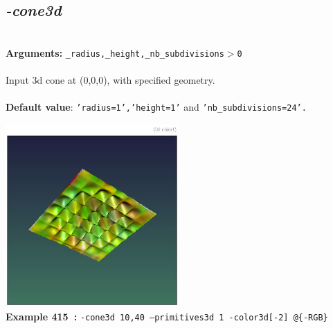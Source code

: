 \documentclass[a4paper,11pt,twoside]{book}
\begin{document}
\subsection{\emph{-cone3d} }\vspace*{-0.5em}
~\\\textbf{Arguments: } 
{\small \texttt{\_radius,\_height,\_nb\_subdivisions$>$0}}\\~\\
Input 3d cone at (0,0,0), with specified geometry.
~\\~\\\textbf{Default value}: {\small \texttt{'radius=1','height=1'} and \texttt{'nb\_subdivisions=24'.}}
\begin{center}\includegraphics[keepaspectratio=true,height=7cm,width=\textwidth]{img/gmic_def415.jpg}\\
{\footnotesize \textbf{Example 415~:} \texttt{-cone3d 10,40 --primitives3d 1 -color3d[-2] @\{-RGB\}}}
\end{center}
\end{document}
